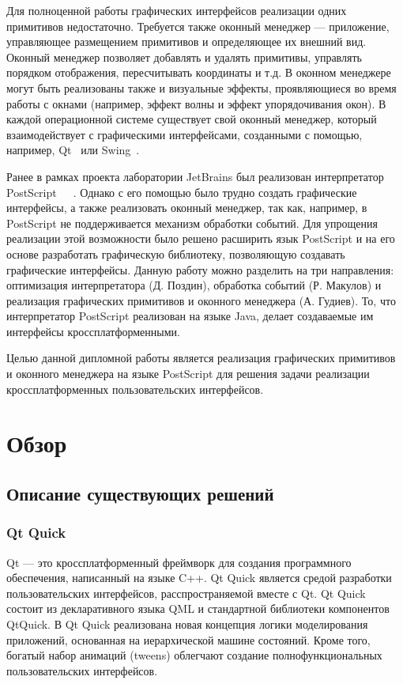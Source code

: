 \documentclass[14pt]{extarticle}
\begin{document}
	Для полноценной работы графических интерфейсов реализации одних примитивов недостаточно. Требуется также оконный менеджер --- приложение, управляющее размещением примитивов и определяющее их внешний вид. Оконный менеджер позволяет добавлять и удалять примитивы, управлять порядком отображения, пересчитывать координаты и т.д. 
	В оконном менеджере могут быть реализованы также и визуальные эффекты, проявляющиеся во время работы с окнами (например, эффект волны и эффект упорядочивания окон).     
	В каждой операционной системе существует свой оконный менеджер, который взаимодействует с графическими интерфейсами, созданными с помощью, например, Qt~\cite{qtquick} или Swing~\cite{swing}. 
	
	Ранее в рамках проекта лаборатории JetBrains был реализован интерпретатор PostScript~\cite{runtime}~\cite{graphic}~\cite{architecture}. Однако с его помощью было трудно создать графические интерфейсы, а также реализовать оконный менеджер, так как, например, в PostScript не поддерживается механизм обработки событий. Для упрощения реализации этой возможности было решено расширить язык PostScript и на его основе разработать графическую библиотеку, позволяющую создавать графические интерфейсы. Данную работу можно разделить на три направления: оптимизация интерпретатора (Д. Поздин), обработка событий (Р. Макулов) и реализация графических примитивов и оконного менеджера (А. Гудиев). То, что интерпретатор PostScript реализован на языке Java, делает создаваемые им интерфейсы кроссплатформенными.
	
	Целью данной дипломной работы является реализация графических примитивов и оконного менеджера на языке PostScript для решения задачи реализации кроссплатформенных пользовательских интерфейсов.
	
	\pagebreak
	\section{Обзор}
	\subsection{ Описание существующих решений }
		\subsubsection*{Qt Quick}

Qt --- это кроссплатформенный фреймворк для создания программного обеспечения, написанный на языке C++.  Qt Quick является средой разработки пользовательских интерфейсов, расспространяемой вместе с Qt. Qt Quick состоит из декларативного языка QML и стандартной библиотеки компонентов QtQuick.
В Qt Quick реализована новая концепция логики моделирования приложений, основанная на иерархической машине состояний\cite{qtquick}. Кроме того, богатый набор анимаций (tweens) облегчают создание полнофункциональных пользовательских интерфейсов.
\end{document}
